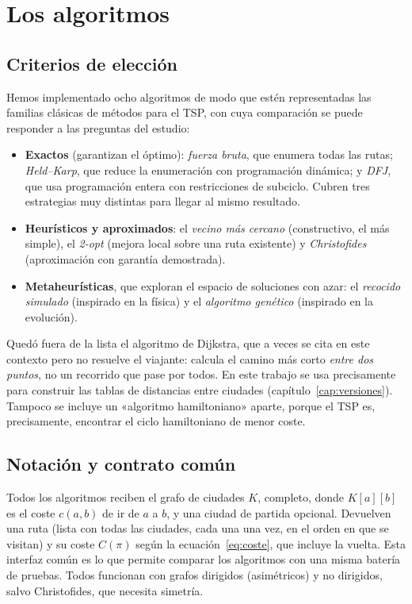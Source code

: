 \chapter{Los algoritmos}\label{cap:algoritmos}

\section{Criterios de elección}

Hemos implementado ocho algoritmos de modo que estén representadas las familias clásicas de métodos para el TSP, con cuya comparación se puede responder a las preguntas del estudio:

\begin{itemize}
  \item \textbf{Exactos} (garantizan el óptimo): \emph{fuerza bruta}, que enumera todas las rutas; \emph{Held--Karp}, que reduce la enumeración con programación dinámica; y \emph{DFJ}, que usa programación entera con restricciones de subciclo.
        Cubren tres estrategias muy distintas para llegar al mismo resultado.
  \item \textbf{Heurísticos y aproximados}: el \emph{vecino más cercano} (constructivo, el más simple), el \emph{2-opt} (mejora local sobre una ruta existente) y \emph{Christofides} (aproximación con garantía demostrada).
  \item \textbf{Metaheurísticas}, que exploran el espacio de soluciones con azar: el \emph{recocido simulado} (inspirado en la física) y el \emph{algoritmo genético} (inspirado en la evolución).
\end{itemize}

Quedó fuera de la lista el algoritmo de Dijkstra, que a veces se cita en este contexto pero no resuelve el viajante: calcula el camino más corto \emph{entre dos puntos}, no un recorrido que pase por todos. En este trabajo se usa
precisamente para construir las tablas de distancias entre ciudades (capítulo~\ref{cap:versiones}). Tampoco se incluye un «algoritmo hamiltoniano» aparte, porque el TSP es, precisamente, encontrar el ciclo hamiltoniano de menor coste.

\section{Notación y contrato común}

Todos los algoritmos reciben el grafo de ciudades $K$, completo, donde $K[a][b]$ es el coste $c(a,b)$ de ir de $a$ a $b$, y una ciudad de partida opcional. Devuelven una ruta (lista con todas las ciudades, cada una una vez,
en el orden en que se visitan) y su coste $C(\pi)$ según la ecuación~\eqref{eq:coste}, que incluye la vuelta. Esta interfaz común es lo que permite comparar los algoritmos con una misma batería de pruebas. Todos funcionan con grafos dirigidos
(asimétricos) y no dirigidos, salvo Christofides, que necesita simetría.

